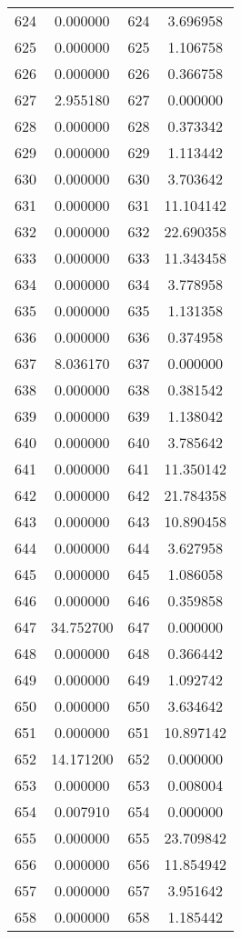 \documentclass[12pt]{article}
\begin{document}
\begin{longtable}{@{}cccc@{}}
624 & 0.000000 & 624 & 3.696958 \\
625 & 0.000000 & 625 & 1.106758 \\
626 & 0.000000 & 626 & 0.366758 \\
627 & 2.955180 & 627 & 0.000000 \\
628 & 0.000000 & 628 & 0.373342 \\
629 & 0.000000 & 629 & 1.113442 \\
630 & 0.000000 & 630 & 3.703642 \\
631 & 0.000000 & 631 & 11.104142 \\
632 & 0.000000 & 632 & 22.690358 \\
633 & 0.000000 & 633 & 11.343458 \\
634 & 0.000000 & 634 & 3.778958 \\
635 & 0.000000 & 635 & 1.131358 \\
636 & 0.000000 & 636 & 0.374958 \\
637 & 8.036170 & 637 & 0.000000 \\
638 & 0.000000 & 638 & 0.381542 \\
639 & 0.000000 & 639 & 1.138042 \\
640 & 0.000000 & 640 & 3.785642 \\
641 & 0.000000 & 641 & 11.350142 \\
642 & 0.000000 & 642 & 21.784358 \\
643 & 0.000000 & 643 & 10.890458 \\
644 & 0.000000 & 644 & 3.627958 \\
645 & 0.000000 & 645 & 1.086058 \\
646 & 0.000000 & 646 & 0.359858 \\
647 & 34.752700 & 647 & 0.000000 \\
648 & 0.000000 & 648 & 0.366442 \\
649 & 0.000000 & 649 & 1.092742 \\
650 & 0.000000 & 650 & 3.634642 \\
651 & 0.000000 & 651 & 10.897142 \\
652 & 14.171200 & 652 & 0.000000 \\
653 & 0.000000 & 653 & 0.008004 \\
654 & 0.007910 & 654 & 0.000000 \\
655 & 0.000000 & 655 & 23.709842 \\
656 & 0.000000 & 656 & 11.854942 \\
657 & 0.000000 & 657 & 3.951642 \\
658 & 0.000000 & 658 & 1.185442 \\

\end{longtable}
\end{document}
